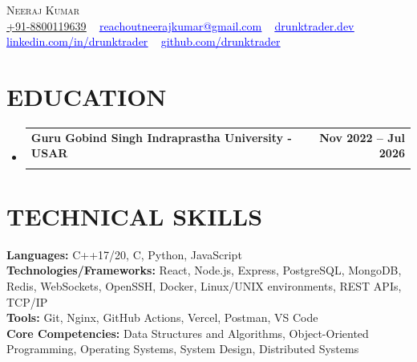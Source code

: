 \documentclass[letterpaper,10pt]{article}
\makeatletter
\newcommand{\resumeSubheading}[4]{
  \vspace{-2pt}\item
    \begin{tabular*}{1.0\textwidth}[t]{l@{\extracolsep{\fill}}r}
      \textbf{\small#1} & \textbf{\small #2} \\
      \text{\small#3} & \text{\small #4} \\
      
    \end{tabular*}\vspace{-7pt}
}
\newcommand{\resumeSubHeadingListStart}{\begin{itemize}[leftmargin=0.0in, label={}]}
\newcommand{\resumeSubHeadingListEnd}{\end{itemize}}
\makeatother
\begin{document}

\begin{center}
    {\Huge \scshape Neeraj Kumar} \\ \vspace{1pt}
    \small \href{tel:+91-8800119639}{\underline{+91-8800119639}} ~ 
    \href{mailto:reachoutneerajkumar@gmail.com}{\textcolor{blue}{\underline{reachoutneerajkumar@gmail.com}}} ~ 
    \href{https://www.drunktrader.dev/}{\textcolor{blue}{\underline{drunktrader.dev}}} ~ 
    \href{https://linkedin.com/in/drunktrader}{\textcolor{blue}{\underline{linkedin.com/in/drunktrader}}} ~
    \href{https://github.com/drunktrader}{\textcolor{blue}{\underline{github.com/drunktrader}}} ~
\end{center}
\vspace{-16pt}

\section{EDUCATION}
  \resumeSubHeadingListStart
    \resumeSubheading
      {Guru Gobind Singh Indraprastha University - USAR}{Nov 2022 -- Jul 2026}
      {\textbf{Bachelor's Degree} - Automation \& Robotics - \textbf{CGPA} - \textbf{7.00}}{New Delhi}
  \resumeSubHeadingListEnd
  \vspace{-10pt}


\section{TECHNICAL SKILLS}
 \begin{itemize}[leftmargin=0.15in, label={}]
    \small{\item{
     \textbf{\small{Languages:}}{  \small{C++17/20, C, Python, JavaScript}} \\ \vspace{1pt}
     \textbf{\small{Technologies/Frameworks:}}{  \small{React, Node.js, Express, PostgreSQL, MongoDB, Redis, WebSockets, OpenSSH, Docker, Linux/UNIX environments, REST APIs, TCP/IP}} \\ \vspace{1pt}
     \textbf{\small{Tools:}}{  \small{Git, Nginx, GitHub Actions, Vercel, Postman, VS Code}} \\ \vspace{1pt}
     \textbf{\small{Core Competencies:}}{  \small{Data Structures and Algorithms, Object-Oriented Programming, Operating Systems, System Design, Distributed Systems}} \\
    }}
 \end{itemize}
\end{document}
